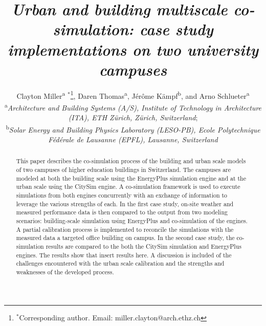 \documentclass{tBPS2e}
\theoremstyle{plain}
\theoremstyle{definition}
\theoremstyle{remark}
\begin{document}


\title{\textit{Urban and building multiscale co-simulation: case study implementations on two university campuses}}

\author{Clayton Miller\textsuperscript{a}%
$^{\ast}$\thanks{$^\ast$Corresponding author. Email: miller.clayton@arch.ethz.ch}, 
Daren Thomas\textsuperscript{a},
J\'er\^ome K\"ampf\textsuperscript{b},
and Arno Schlueter\textsuperscript{a}\\
\vspace{6pt}
\textsuperscript{a}{\em Architecture and Building Systems (A/S), Institute of Technology in Architecture (ITA), ETH Z\"urich, Z\"urich, Switzerland};\\
\textsuperscript{b}{\em Solar Energy and Building Physics Laboratory (LESO-PB), Ecole Polytechnique F\'ed\'erale de Lausanne (EPFL), Lausanne, Switzerland}
}

\maketitle

\begin{abstract}
This paper describes the co-simulation process of the building and urban scale models of two campuses of higher education buildings in Switzerland. The campuses are modeled at both the building scale using the EnergyPlus simulation engine and at the urban scale using the CitySim engine. A co-simulation framework is used to execute simulations from both engines concurrently with an exchange of information to leverage the various strengths of each. In the first case study, on-site weather and measured performance data is then compared to the output from two modeling scenarios: building-scale simulation using EnergyPlus and co-simulation of the engines. A partial calibration process is implemented to reconcile the simulations with the measured data a targeted office building on campus. In the second case study, the co-simulation results are compared to the both the CitySim simulation and EnergyPlus engines. The results show that {\color{red}insert results here}. A discussion is included of the challenges encountered with the urban scale calibration and the strengths and weaknesses of the developed process.
\end{abstract}

\end{document}

